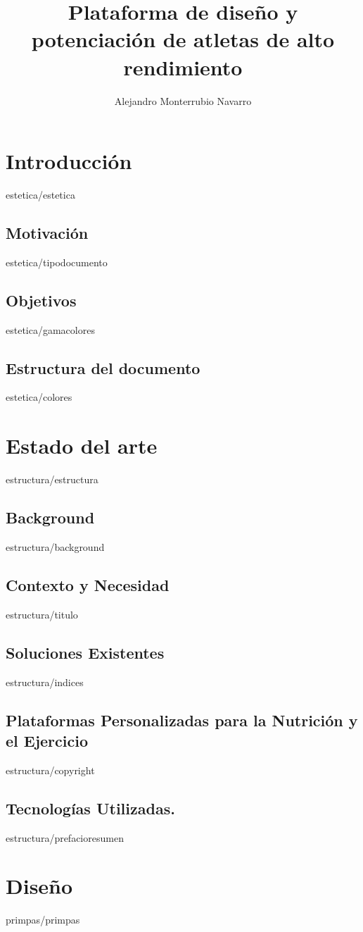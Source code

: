 \documentclass[epsbased,copyright,final,printable,covers,extendedindex,firstnumbered,tfg,gnuplot]{tfgtfmthesisuam}
\title{Plataforma de diseño y potenciación de atletas de alto rendimiento}
\author{Alejandro Monterrubio Navarro}
\begin{document}
\chapter{Introducción\label{CAP:ESTETICA}}{estetica/estetica}
  \section{Motivación\label{SEC:TIPODOC}}{estetica/tipodocumento}
  \section{Objetivos\label{SEC:GAMASEL}}{estetica/gamacolores}
  \section{Estructura del documento\label{SEC:COLORES}}{estetica/colores}

\chapter{Estado del arte\label{CAP:ESTRUCTURA}}{estructura/estructura}
  \section{Background\label{CAP:BACKGROUND}}{estructura/background}
  \section{Contexto y Necesidad\label{SEC:VARIABLES}}{estructura/titulo}
  \section{Soluciones Existentes\label{SEC:INDICES}}{estructura/indices}
  \section{Plataformas Personalizadas para la Nutrición y el Ejercicio\label{SEC:COPYRIGHT}}{estructura/copyright}
  \section{Tecnologías Utilizadas.\label{SEC:PREFACIO}}{estructura/prefacioresumen}

\chapter{Diseño\label{CAP:PRIMEROSPASOS}}{primpas/primpas}
\end{document}
